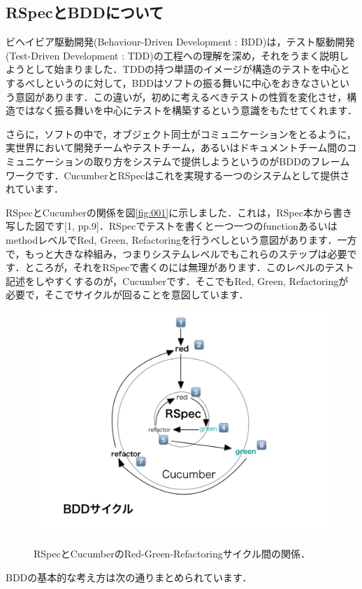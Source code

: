 
\subsection{RSpecとBDDについて}
ビヘイビア駆動開発(Behaviour-Driven Development : BDD)は，テスト駆動開発(Test-Driven Development : TDD)の工程への理解を深め，それをうまく説明しようとして始まりました．TDDの持つ単語のイメージが構造のテストを中心とするべしというのに対して，BDDはソフトの振る舞いに中心をおきなさいという意図があります．この違いが，初めに考えるべきテストの性質を変化させ，構造ではなく振る舞いを中心にテストを構築するという意識をもたせてくれます．

さらに，ソフトの中で，オブジェクト同士がコミュニケーションをとるように，実世界において開発チームやテストチーム，あるいはドキュメントチーム間のコミュニケーションの取り方をシステムで提供しようというのがBDDのフレームワークです．CucumberとRSpecはこれを実現する一つのシステムとして提供されています．

RSpecとCucumberの関係を図\ref{fig:001}に示しました．これは，RSpec本から書き写した図です[1, pp.9]．RSpecでテストを書くと一つ一つのfunctionあるいはmethodレベルでRed, Green, Refactoringを行うべしという意図があります．一方で，もっと大きな枠組み，つまりシステムレベルでもこれらのステップは必要です．ところが，それをRSpecで書くのには無理があります．このレベルのテスト記述をしやすくするのが，Cucumberです．そこでもRed, Green, Refactoringが必要で，そこでサイクルが回ることを意図しています．

\begin{figure}[htbp]\begin{center}
\includegraphics[width=12cm,bb= 0 0 937 753]{../figs/./my_help_nasu.001.jpeg}
\caption{RSpecとCucumberのRed-Green-Refactoringサイクル間の関係．}
\label{fig:001}
\label{default}\end{center}\end{figure}
BDDの基本的な考え方は次の通りまとめられています．

